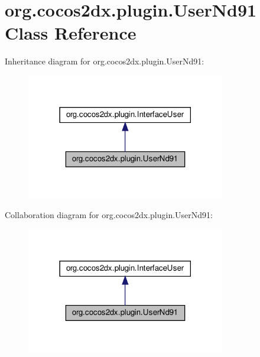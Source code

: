\hypertarget{classorg_1_1cocos2dx_1_1plugin_1_1UserNd91}{}\section{org.\+cocos2dx.\+plugin.\+User\+Nd91 Class Reference}
\label{classorg_1_1cocos2dx_1_1plugin_1_1UserNd91}


Inheritance diagram for org.\+cocos2dx.\+plugin.\+User\+Nd91\+:
\nopagebreak
\begin{figure}[H]
\begin{center}
\leavevmode
\includegraphics[width=246pt]{classorg_1_1cocos2dx_1_1plugin_1_1UserNd91__inherit__graph}
\end{center}
\end{figure}


Collaboration diagram for org.\+cocos2dx.\+plugin.\+User\+Nd91\+:
\nopagebreak
\begin{figure}[H]
\begin{center}
\leavevmode
\includegraphics[width=246pt]{classorg_1_1cocos2dx_1_1plugin_1_1UserNd91__coll__graph}
\end{center}
\end{figure}
